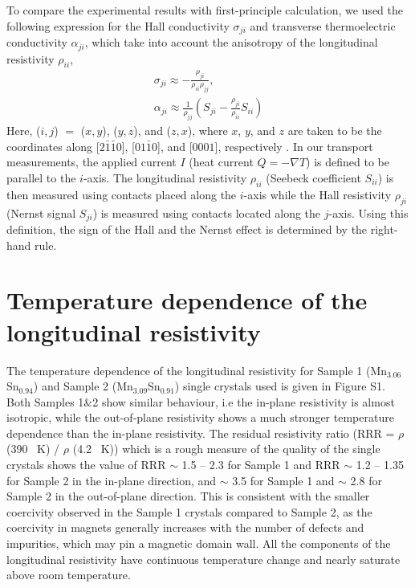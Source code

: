 \documentclass[amsmath,amssymb]{nature}
\newcommand{\cut}[1]{\textcolor{red}{\sout{#1}}}
\begin{document}
	
	To compare  the experimental results with first-principle calculation, we used the following expression for  the Hall conductivity $\sigma_{ji}$ and transverse thermoelectric conductivity $\alpha_{ji}$, which take into account the anisotropy of the longitudinal resistivity $\rho_{ii}$,
	\begin{eqnarray}
	\sigma_{ji}\approx-\frac{\rho_{ji}}{\rho_{ii}\rho_{jj}},\\ \alpha_{ji}\approx \frac{1}{\rho_{jj}}(S_{ji}-\frac{\rho_{ji}}{\rho_{ii}}S_{ii})
	\end{eqnarray}
	Here, ($i,j$) $=$ ($x,y$), ($y,z$), and ($z,x$), where $x$, $y$, and $z$ are taken to be the coordinates along [$2\bar{1}\bar{1}0$], [$01\bar{1}0$], and [$0001$], respectively \cite{Kiyohara2016}.  In our transport measurements, the applied current $I$ (heat current $Q = -\nabla T$) is defined to be parallel to the $i$-axis. The longitudinal resistivity $\rho_{ii}$ (Seebeck coefficient $S_{ii}$) is then measured using contacts placed along the $i$-axis while the Hall resistivity $\rho_{ji}$ (Nernst signal $S_{ji}$) is measured using contacts located along the $j$-axis. Using this definition, the sign of the Hall and the Nernst effect is determined by the right-hand rule.
	
	\color{black}
	
	
	
	
	
	\section{Temperature dependence of the longitudinal resistivity}
	The temperature dependence of the longitudinal resistivity for  Sample 1 (Mn$_{3.06}$Sn$_{0.94}$) and Sample 2 (Mn$_{3.09}$Sn$_{0.91}$) single crystals used is given in Figure S1. Both Samples 1$\&$2 show similar behaviour, i.e the in-plane resistivity is almost isotropic, while the out-of-plane resistivity shows a much stronger temperature dependence than the in-plane resistivity.   The residual resistivity ratio (RRR = $\rho$ (390 \ K) / $\rho$ (4.2 \ K)) which is a rough measure of the quality of the single crystals shows the value of RRR $\sim$ 1.5 -- 2.3 for Sample 1 and RRR $\sim$ 1.2 -- 1.35 for Sample 2 in the in-plane direction, and  $\sim$ 3.5  for Sample 1 and  $\sim$ 2.8 for Sample 2 in the out-of-plane direction. 
	This is consistent with the smaller coercivity observed in the Sample 1 crystals compared to Sample 2, as the coercivity in magnets generally increases with the number of defects and impurities, which may pin a magnetic domain wall. All the components of the longitudinal resistivity have continuous temperature change and nearly saturate above room temperature. \color{black} %
	
\end{document}
